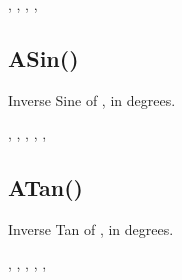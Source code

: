 \documentclass[letterpaper,10pt,english]{sphinxmanual}
\begin{document}
\begin{sphinxVerbatim}[commandchars=\\\{\}]
\end{sphinxVerbatim}

\sphinxAtStartPar
{}

\sphinxAtStartPar
{}, , , , 


\subsection{ASin()}
\label{\detokenize{reference/peblmath:asin}}
\sphinxAtStartPar
{}

\sphinxAtStartPar
Inverse Sine of , in degrees.

\sphinxAtStartPar
{}

\begin{sphinxVerbatim}[commandchars=\\\{\}]
\end{sphinxVerbatim}

\sphinxAtStartPar
{}

\sphinxAtStartPar
{}, , , , , 


\subsection{ATan()}
\label{\detokenize{reference/peblmath:atan}}
\sphinxAtStartPar
{}

\sphinxAtStartPar
Inverse Tan of , in degrees.

\sphinxAtStartPar
{}

\sphinxAtStartPar
{}, , , , , 
\end{document}
